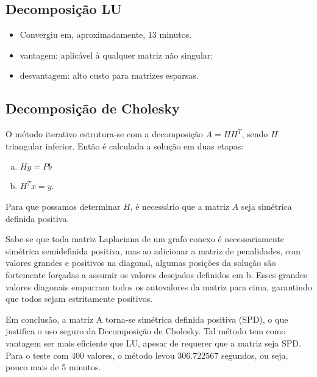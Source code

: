 \documentclass{article} %
\theoremstyle{definition}
\begin{document}
        \subsection*{Decomposição LU}
            \begin{itemize}
                \item Convergiu em, aproximadamente, 13 minutos.
                \item vantagem: aplicável à qualquer matriz não singular;
                \item desvantagem: alto custo para matrizes esparsas.
            \end{itemize}
            \subsection*{Decomposição de Cholesky}
            
                O método iterativo estrutura-se com a decomposição $A = HH^T$, sendo $H$ triangular
                inferior.
                Então é calculada a solução em duas etapas:
                \begin{enumerate}[a)]
                    \item $Hy = Pb$
                    \item $H^Tx = y$.
                \end{enumerate}
                Para que possamos determinar $H$, é necessário que a matriz $A$ seja simétrica
                definida positiva.

                Sabe-se que toda matriz Laplaciana de um grafo conexo é necessariamente simétrica 
                semidefinida
                positiva, mas ao adicionar a matriz de penalidades, com valores grandes e positivos 
                na diagonal,
                algumas posições da solução são fortemente forçadas a assumir os valores desejados
                definidos em b.
                Esses grandes valores diagonais empurram todos os autovalores da matriz para cima,
                garantindo
                que todos sejam estritamente positivos.

                Em conclusão, a matriz A torna-se simétrica definida positiva
                (SPD), o que justifica o uso seguro da Decomposição de Cholesky.
                Tal método tem como vantagem ser mais eficiente que LU, apesar de requerer que a 
                matriz seja SPD.
                Para o teste com 400 valores, o método levou $306.722567$ segundos, ou seja, 
                pouco mais de 5 minutos.
\end{document}
